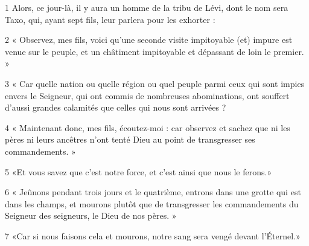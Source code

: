 
\par 1 Alors, ce jour-là, il y aura un homme de la tribu de Lévi, dont le nom sera Taxo, qui, ayant sept fils, leur parlera pour les exhorter :
\par 2 « Observez, mes fils, voici qu'une seconde visite impitoyable (et) impure est venue sur le peuple, et un châtiment impitoyable et dépassant de loin le premier. »
\par 3 « Car quelle nation ou quelle région ou quel peuple parmi ceux qui sont impies envers le Seigneur, qui ont commis de nombreuses abominations, ont souffert d'aussi grandes calamités que celles qui nous sont arrivées ?
\par 4 « Maintenant donc, mes fils, écoutez-moi : car observez et sachez que ni les pères ni leurs ancêtres n'ont tenté Dieu au point de transgresser ses commandements. »
\par 5 «Et vous savez que c'est notre force, et c'est ainsi que nous le ferons.»
\par 6 « Jeûnons pendant trois jours et le quatrième, entrons dans une grotte qui est dans les champs, et mourons plutôt que de transgresser les commandements du Seigneur des seigneurs, le Dieu de nos pères. »
\par 7 «Car si nous faisons cela et mourons, notre sang sera vengé devant l'Éternel.»


